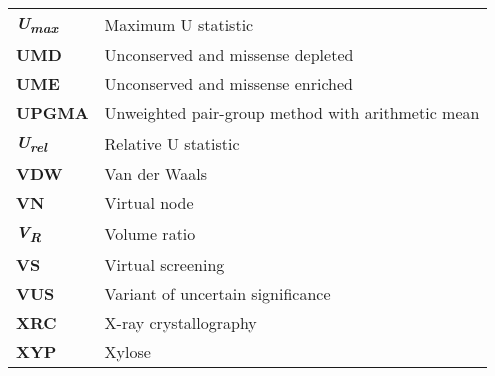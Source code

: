 \begin{longtable}[l]{@{}p{2.5cm}p{12cm}@{}}
\textbf{\textit{U\textsubscript{max}}} & Maximum U statistic \\
\textbf{UMD} & Unconserved and missense depleted \\
\textbf{UME} & Unconserved and missense enriched \\
\textbf{UPGMA} & Unweighted pair-group method with arithmetic mean \\
\textbf{\textit{U\textsubscript{rel}}} & Relative U statistic \\
\textbf{VDW} & Van der Waals \\
\textbf{VN} & Virtual node \\
\textbf{\textit{V\textsubscript{R}}} & Volume ratio \\
\textbf{VS} & Virtual screening \\
\textbf{VUS} & Variant of uncertain significance \\
\textbf{XRC} & X-ray crystallography \\
\textbf{XYP} & Xylose \\

\end{longtable}
